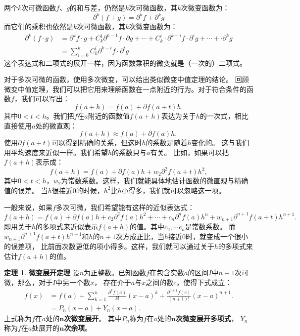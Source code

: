 \documentclass[12pt,UTF8]{ctexbook}
\theoremstyle{definition}
\newtheorem{tm}{定理}[section]
\theoremstyle{plain}
\begin{document}
两个$k$次可微函数$f$、$g$的和与差，仍然是$k$次可微函数，其$k$次微变函数为：
$$ \partial^k (f \pm g) = \partial^k f \pm \partial^k g $$
而它们的乘积也依然是$k$次可微函数，其$k$次微变函数为：
\begin{align*}
    \partial^k (f \cdot g) &= \partial^k f \cdot g + C_k^1 \partial^{k-1} f \cdot \partial g + \cdots + C_k^i \cdot \partial^{k-i} f \cdot  \partial^i g + \cdots + \cdot \partial^{k} g  \\
    &= \sum_{i=0}^k C_k^i \partial^{k-i} f \cdot  \partial^i g 
\end{align*}
这个表达式和二项式的展开一样，因为函数乘积的微变就是（一次的）二项式。

对于多次可微的函数，使用多次微变，可以给出类似微变中值定理的结论。
回顾微变中值定理，我们可以把它用来理解函数在一点附近的行为。对于符合条件的函数$f$，我们可以写出：
$$ f(a + h) = f(a) + \partial f(a + t) h.$$
其中$0<t<h$。我们把$f$在$a$附近的函数值$f(a+h)$表达为关于$h$的一次式，相比直接使用$a$处的微直观：
$$ f(a + h) \approx f(a) + \partial f(a) h,$$
使用$\partial f(a + t)$可以得到精确的关系，但这时$h$的系数是随着$h$变化的。
这与我们用平均速度来近似一样。我们希望$h$的系数只与$a$有关。
比如，如果可以把$f(a + h)$表示成：
$$ f(a + h) = f(a) + \partial f(a) h + w_2\partial^2 f(a + t) h^2,$$
其中$0<t<h$，$w_2$为常数系数。这样，我们就能具体地估计函数的微直观与精确值的误差。
当$h$很接近$0$的时候，$h^2$比$h$小得多，我们就可以忽略这一项。

一般来说，如果$f$多次可微，我们希望能有这样的近似表达式：
$$ f(a + h) = f(a) + \partial f(a) h + c_2 \partial^2 f(a) h^2 + \cdots + c_n \partial^n f(a) h^n + w_{n+1}\partial^{n+1} f(a + t) h^{n+1}.$$
即用关于$h$的多项式来近似表示$f(a + h)$的值。其中$c_2, \cdots c_n$是常数系数。
而$w_{n+1}\partial^{n+1} f(a + t) h^{n+1}$和$h$的$n+1$次方成正比，当$h$接近$0$时，就变成一个很小的误差项，
比前面次数更低的项小得多。这样，我们就可以通过关于$h$的多项式来估计$f(a + h)$的值。

\begin{tm}{\textbf{微变展开定理}}
    设$n$为正整数。已知函数$f$在包含实数$a$的区间$I$中$n+1$次可微，那么，对于$I$中另一个数$x$，
    存在介于$a$与$x$之间的数$c$，使得下式成立：
    \begin{align*}
        f(x) &= f(a) + \sum_{k=1}^n \frac{\partial^k f (a)}{k!}(x - a)^k + \frac{\partial^{n+1} f (c)}{(n+1)!}(x - a)^{n+1}.  \\
        &= P_n(x - a) + Y_n(x - a). 
    \end{align*}
    上式称为$f$在$a$处的$\boldsymbol{n}$\textbf{次微变展开}。
    其中$P_n$称为$f$在$a$处的$\boldsymbol{n}$\textbf{次微变展开多项式}，
    $Y_n$称为$f$在$a$处展开的$\boldsymbol{n}$\textbf{次余项}。
    
\end{tm}
\end{document}
